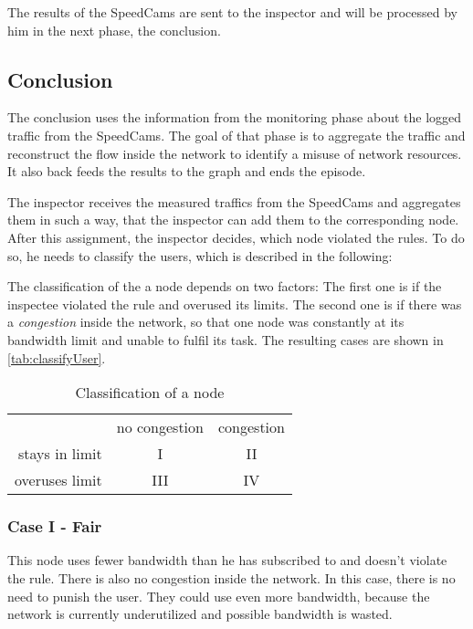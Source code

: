 \documentclass[thesis.tex]{subfiles}
\begin{document}
The results of the SpeedCams are sent to the inspector and will be processed by him in the next phase, the conclusion.

\subsection{Conclusion} \label{sec:main:conclusionphase}
The conclusion uses the information from the monitoring phase about the logged traffic from the SpeedCams. The goal of that phase is to aggregate the traffic and reconstruct the flow inside the network to identify a misuse of network resources. It also back feeds the results to the graph and ends the episode.

The inspector receives the measured traffics from the SpeedCams and aggregates them in such a way, that the inspector can add them to the corresponding node. After this assignment, the inspector decides, which node violated the rules. To do so, he needs to classify the users, which is described in the following:

The classification of the a node depends on two factors: The first one is if the inspectee violated the rule and overused its limits. The second one is if there was a \textit{congestion} inside the network, so that one node was constantly at its bandwidth limit and unable to fulfil its task. The resulting cases are shown in \autoref{tab:classifyUser}.

\begin{table}[h]
    \centering
    \begin{tabular}{ r|c|c| }
        \multicolumn{1}{r}{}
        &  \multicolumn{1}{c}{no congestion}
        & \multicolumn{1}{c}{congestion} \\
        \cline{2-3}
        stays in limit & I & II \\
        \cline{2-3}
        overuses limit & III & IV \\
        \cline{2-3}
    \end{tabular}
    \caption{Classification of a node}
    \label{tab:classifyUser}    
\end{table}

\subsubsection{Case I - Fair} \label{sub:main:detection:case1}
This node uses fewer bandwidth than he has subscribed to and doesn't violate the rule. There is also no congestion inside the network. In this case, there is no need to punish the user. They could use even more bandwidth, because the network is currently underutilized and possible bandwidth is wasted.
\end{document}
